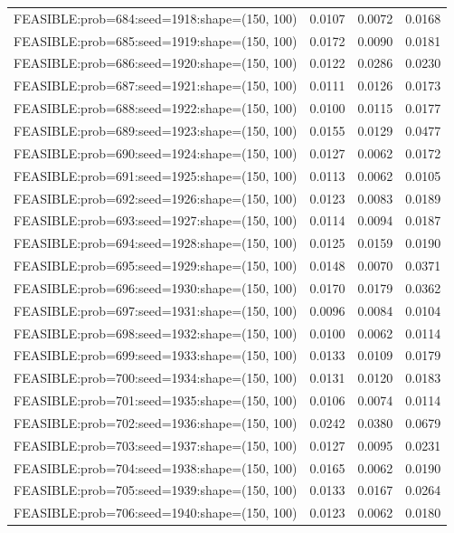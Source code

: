 \begin{longtable}{lccc}
FEASIBLE:prob=684:seed=1918:shape=(150, 100) &   0.0107 & 0.0072 & 0.0168 \\
FEASIBLE:prob=685:seed=1919:shape=(150, 100) &   0.0172 & 0.0090 & 0.0181 \\
FEASIBLE:prob=686:seed=1920:shape=(150, 100) &   0.0122 & 0.0286 & 0.0230 \\
FEASIBLE:prob=687:seed=1921:shape=(150, 100) &   0.0111 & 0.0126 & 0.0173 \\
FEASIBLE:prob=688:seed=1922:shape=(150, 100) &   0.0100 & 0.0115 & 0.0177 \\
FEASIBLE:prob=689:seed=1923:shape=(150, 100) &   0.0155 & 0.0129 & 0.0477 \\
FEASIBLE:prob=690:seed=1924:shape=(150, 100) &   0.0127 & 0.0062 & 0.0172 \\
FEASIBLE:prob=691:seed=1925:shape=(150, 100) &   0.0113 & 0.0062 & 0.0105 \\
FEASIBLE:prob=692:seed=1926:shape=(150, 100) &   0.0123 & 0.0083 & 0.0189 \\
FEASIBLE:prob=693:seed=1927:shape=(150, 100) &   0.0114 & 0.0094 & 0.0187 \\
FEASIBLE:prob=694:seed=1928:shape=(150, 100) &   0.0125 & 0.0159 & 0.0190 \\
FEASIBLE:prob=695:seed=1929:shape=(150, 100) &   0.0148 & 0.0070 & 0.0371 \\
FEASIBLE:prob=696:seed=1930:shape=(150, 100) &   0.0170 & 0.0179 & 0.0362 \\
FEASIBLE:prob=697:seed=1931:shape=(150, 100) &   0.0096 & 0.0084 & 0.0104 \\
FEASIBLE:prob=698:seed=1932:shape=(150, 100) &   0.0100 & 0.0062 & 0.0114 \\
FEASIBLE:prob=699:seed=1933:shape=(150, 100) &   0.0133 & 0.0109 & 0.0179 \\
FEASIBLE:prob=700:seed=1934:shape=(150, 100) &   0.0131 & 0.0120 & 0.0183 \\
FEASIBLE:prob=701:seed=1935:shape=(150, 100) &   0.0106 & 0.0074 & 0.0114 \\
FEASIBLE:prob=702:seed=1936:shape=(150, 100) &   0.0242 & 0.0380 & 0.0679 \\
FEASIBLE:prob=703:seed=1937:shape=(150, 100) &   0.0127 & 0.0095 & 0.0231 \\
FEASIBLE:prob=704:seed=1938:shape=(150, 100) &   0.0165 & 0.0062 & 0.0190 \\
FEASIBLE:prob=705:seed=1939:shape=(150, 100) &   0.0133 & 0.0167 & 0.0264 \\
FEASIBLE:prob=706:seed=1940:shape=(150, 100) &   0.0123 & 0.0062 & 0.0180 \\

\end{longtable}
